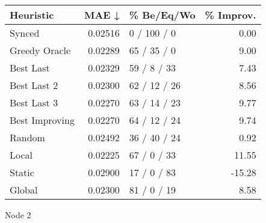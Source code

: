 \begin{tabular}{lrlr}
\toprule
\textbf{Heuristic} & \textbf{MAE ↓} & \textbf{\% Be/Eq/Wo} & \textbf{\% Improv.} \\
\midrule
            Synced &        0.02516 &          0 / 100 / 0 &                0.00 \\
     Greedy Oracle &        0.02289 &          65 / 35 / 0 &                9.00 \\
         Best Last &        0.02329 &          59 / 8 / 33 &                7.43 \\
       Best Last 2 &        0.02300 &         62 / 12 / 26 &                8.56 \\
       Best Last 3 &        0.02270 &         63 / 14 / 23 &                9.77 \\
    Best Improving &        0.02270 &         64 / 12 / 24 &                9.74 \\
            Random &        0.02492 &         36 / 40 / 24 &                0.92 \\
             Local &        0.02225 &          67 / 0 / 33 &               11.55 \\
            Static &        0.02900 &          17 / 0 / 83 &              -15.28 \\
            Global &        0.02300 &          81 / 0 / 19 &                8.58 \\
\bottomrule
\end{tabular}
\caption{Node 2}
\label{tab:non_lr01_le1_bs4_2}
